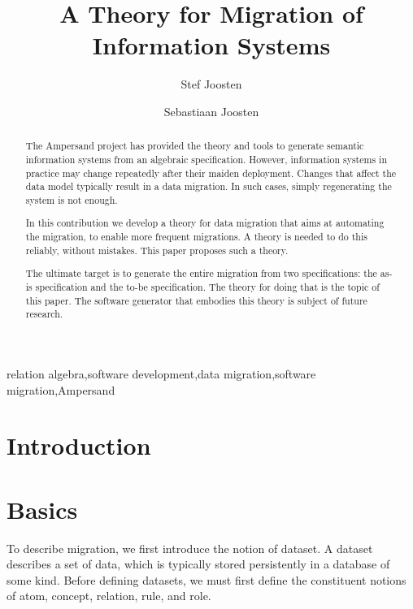 \documentclass{elsarticle}
\begin{document}


\title{A Theory for Migration of Information Systems}
\author[ou,ordina]{Stef Joosten}
\author[umn]{Sebastiaan Joosten}
\address[ou]{Open Universiteit Nederland, Heerlen, the Netherlands}
\address[ordina]{Ordina NV, Nieuwegein, the Netherlands}
\address[umn]{University of Minnesota, Minneapolis, USA}

\begin{abstract}
	The Ampersand project has provided the theory and tools to generate semantic information systems from an algebraic specification.
	However, information systems in practice may change repeatedly after their maiden deployment.
	Changes that affect the data model typically result in a data migration.
	In such cases, simply regenerating the system is not enough.

	In this contribution we develop a theory for data migration that aims at automating the migration,
	to enable more frequent migrations.
	A theory is needed to do this reliably, without mistakes.
	This paper proposes such a theory.

	The ultimate target is to generate the entire migration from two specifications: the as-is specification and the to-be specification.
	The theory for doing that is the topic of this paper.
	The software generator that embodies this theory is subject of future research.
\end{abstract}

\begin{keyword}
relation algebra\sep software development\sep data migration\sep software migration\sep Ampersand
\end{keyword}
\maketitle

\section{Introduction}
\label{sct:Introduction}

\section{Basics}
\label{sct:Basics}
	To describe migration, we first introduce the notion of dataset.
	A dataset describes a set of data, which is typically stored persistently in a database of some kind.
	Before defining datasets, we must first define the constituent notions of atom, concept, relation, rule, and role.
\end{document}
